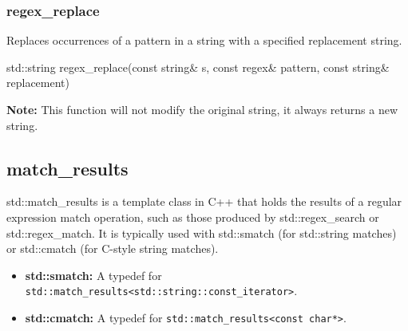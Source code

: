 \documentclass{report}
\begin{document}
    \pagebreak 
    \subsubsection{regex\_replace}
    \bigbreak \noindent 
    Replaces occurrences of a pattern in a string with a specified replacement string.
    \bigbreak \noindent 
    \begin{cppcode}
        std::string regex_replace(const string& s, const regex& pattern, const string& replacement) 
    \end{cppcode}
    \bigbreak \noindent 
    \textbf{Note:} This function will not modify the original string, it always returns a new string. 

    \bigbreak \noindent 
    \subsection{match\_results}
    \bigbreak \noindent 
    std::match\_results is a template class in C++ that holds the results of a regular expression match operation, such as those produced by std::regex\_search or std::regex\_match. It is typically used with std::smatch (for std::string matches) or std::cmatch (for C-style string matches).
    \bigbreak \noindent 
    \begin{itemize}
        \item \textbf{std::smatch:} A typedef for \texttt{std::match\_results<std::string::const\_iterator>}.
        \item \textbf{std::cmatch:} A typedef for \texttt{std::match\_results<const char*>}.
    \end{itemize}
    \bigbreak \noindent 
\end{document}
